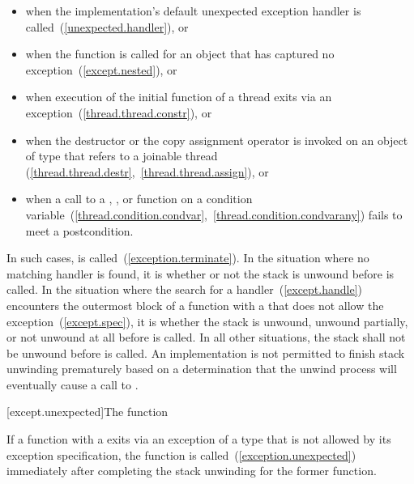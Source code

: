 \begin{itemize}
\item%
when the implementation's default
unexpected exception handler
is called~(\ref{unexpected.handler}), or

\item%
when the function  is called for an object
that has captured no exception~(\ref{except.nested}), or

\item%
when execution of the initial function of a thread exits via
an exception~(\ref{thread.thread.constr}), or

\item%
when the destructor or the copy assignment operator is invoked on an object
of type  that refers to a joinable thread
(\ref{thread.thread.destr},~\ref{thread.thread.assign}), or

\item%
when a call to a , , or 
function on a condition variable~(\ref{thread.condition.condvar},~\ref{thread.condition.condvarany})
fails to meet a postcondition.

\end{itemize}

\exitnote

\pnum
{}%
In such cases,
is called~(\ref{exception.terminate}).
In the situation where no matching handler is found, it is
 whether or not the
stack is unwound
before
is called.
In the situation where the search for a handler~(\ref{except.handle}) encounters the
outermost block of a function with a 
that does not allow the exception~(\ref{except.spec}), it is
whether the stack is unwound, unwound partially, or not unwound at all
before  is called.
In all other situations, the stack shall not be unwound before
is called.
An implementation is not permitted to finish stack unwinding
prematurely based on a determination that the unwind process
will eventually cause a call to
.

[except.unexpected]{The  function}

\pnum
{}%
If a function with
a 
exits via an exception
of a type that is not allowed by its exception specification,
the function
is called~(\ref{exception.unexpected}) immediately after completing
the stack unwinding for the former function.

